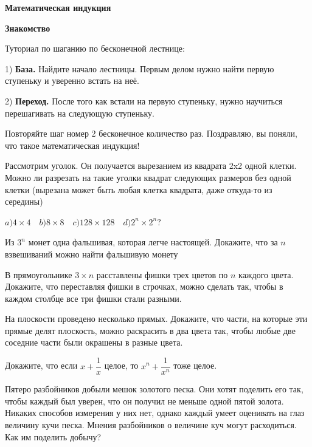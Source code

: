 \centerline{\bf \Huge Математическая индукция}
\centerline{\bf \Huge Знакомство}

\begin{flushright}
        \scriptsize{}
\end{flushright}

Туториал по шаганию по бесконечной лестнице:

1) \textbf{База.} Найдите начало лестницы. Первым делом нужно найти первую ступеньку и уверенно встать на неё.

2) \textbf{Переход.} После того как встали на первую ступеньку, нужно научиться перешагивать на следующую ступеньку. 

Повторяйте шаг номер 2 бесконечное количество раз. Поздравляю, вы поняли, что такое математическая индукция!

Рассмотрим уголок. Он получается вырезанием из квадрата 2x2 одной клетки. Можно ли разрезать на такие уголки квадрат следующих размеров без одной клетки (вырезана может быть любая клетка квадрата, даже откуда-то из середины)

$a)4\times4 \quad b)8\times8  \quad c)128\times128 \quad d)2^n\times2^n ?$


Из $3^n$ монет одна фальшивая, которая легче настоящей. Докажите, что за $n$
взвешиваний можно найти фальшивую монету

В прямоугольнике $3 \times n$ расставлены фишки трех цветов по $n$ каждого цвета. Докажите, что переставляя фишки в строчках, можно сделать так, чтобы в каждом столбце все три фишки стали разными.

На плоскости проведено несколько прямых. Докажите, что части, на которые эти
прямые делят плоскость, можно раскрасить в два цвета так, чтобы любые две
соседние части были окрашены в разные цвета.

Докажите, что если $x + \dfrac{1}{x}$ целое, то $x^n +\dfrac{1}{x^n}$ тоже целое.

Пятеро разбойников добыли мешок золотого песка. Они хотят поделить его так, чтобы каждый был уверен, что он получил не меньше одной пятой золота. Никаких способов измерения у них нет, однако каждый умеет оценивать на глаз величину кучи песка. Мнения разбойников о величине куч могут расходиться. Как им поделить добычу?
